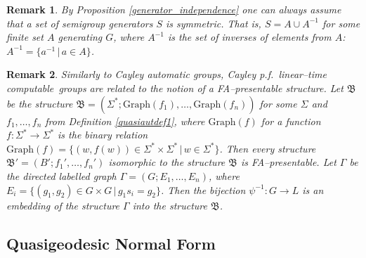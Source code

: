 \documentclass[article,12pt]{elsarticle}
\newtheorem{remark}{Remark}
\newcommand\linearC{Cayley p.f.~linear--time computable}
\begin{document}
\begin{remark} 
	By Proposition \ref{generator_independence} one 
	can always assume that a set of semigroup 
	generators $S$ is symmetric. That is, 
	$S = A \cup A^{-1}$ for some finite 
	set $A$ generating $G$, where $A^{-1}$ is 
	the set of inverses of elements from $A$: 
	$A^{-1} = \{a^{-1} \, | \, a \in A\}$.    
\end{remark}	
\begin{remark}
	Similarly to Cayley automatic groups, 
	\linearC\ groups are related 
	to the notion of a FA--presentable structure.  
	Let $\mathfrak{B}$ be the structure 
	$\mathfrak{B}=\left(\Sigma^*; 
	\mathrm{Graph}(f_1),\dots,\mathrm{Graph}(f_n) \right)$ 
	for some $\Sigma$ and $f_1,\dots,f_n$ from 
	Definition \ref{quasiautdef1}, 
	where $\mathrm{Graph}(f)$ for a function 
	$f: \Sigma^* \rightarrow \Sigma^*$ is the 
	binary relation
	$\mathrm{Graph}(f) = \{(w,f(w)) \in 
	\Sigma^* \times \Sigma^* \, | \, w \in \Sigma^*\}$. Then every 
	structure $\mathfrak{B}' = 
	\left(B'; f_1',\dots,f_n'\right)$ isomorphic 
	to the structure $\mathfrak{B}$ is FA--presentable. 
	Let $\Gamma$ be the directed labelled graph
	$\Gamma = \left(G; E_1,\dots, E_n\right)$, 
	where $E_i = \{(g_1,g_2) \in G \times G \,|\, 
	g_1 s_i = g_2\}$. 
	Then the bijection $\psi^{-1} : G \rightarrow L$ is 
	an embedding of the structure $\Gamma$ into 
	the structure $\mathfrak{B}$.       
\end{remark}


\subsection{Quasigeodesic Normal Form} 
 
\end{document}
